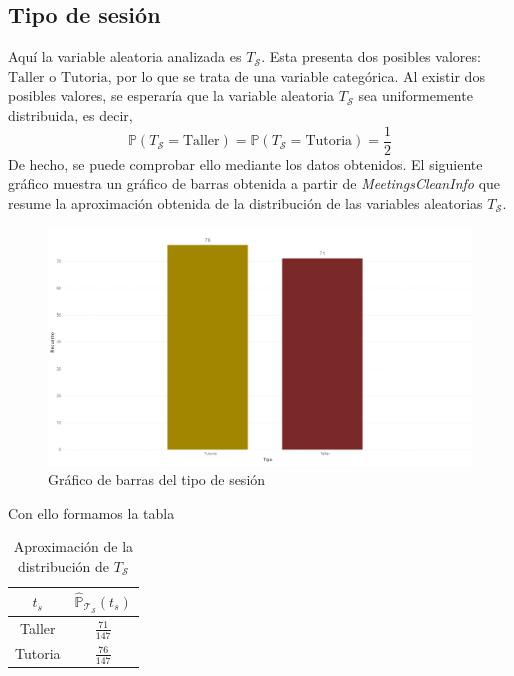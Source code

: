 \documentclass[11pt,a4paper]{book}
\theoremstyle{definition}%
\newcommand{\Probsymb}{\mathds{P}}
\newcommand{\Prob}[1]{\mathds{P}\left( #1 \right)}
\begin{document}
             \subsection{Tipo de sesión}
                Aquí la variable aleatoria analizada es $T_\mathcal{S}$. Esta presenta dos posibles valores: $\text{Taller}$ o $\text{Tutoria}$, por lo que se trata de una variable categórica. Al existir dos posibles valores, se esperaría que la variable aleatoria $T_\mathcal{S}$ sea uniformemente distribuida, es decir,
                \begin{equation}\label{uniforme tipo de sesion}
                    \Prob{T_\mathcal{S}=\text{Taller}}=\Prob{T_\mathcal{S}=\text{Tutoria}}=\frac{1}{2}
                \end{equation}
                De hecho, se puede comprobar ello mediante los datos obtenidos. El siguiente gráfico muestra un gráfico de barras obtenida a partir de \textit{MeetingsCleanInfo} que resume la aproximación obtenida de la distribución de las variables aleatorias $T_\mathcal{S}$.
                \begin{figure}[H]
                    \centering
                    \includegraphics[width=1\textwidth]{Sources/histograma_TipoGlobal.png}
                    \caption{Gráfico de barras del tipo de sesión}
                    \label{fig:histograma_TipoGlobal}
                \end{figure}
                Con ello formamos la tabla
                \begin{table}[H]
                    \centering
                    \begin{tabular}{|c|c|}
                        \hline
                        $t_s$ & $\hat{\Probsymb}_{\mathcal{T}_\mathcal{S}}(t_s)$ \\ \hline
                        Taller & $\frac{71}{147}$ \\ \hline
                        Tutoria & $\frac{76}{147}$ \\ \hline
                    \end{tabular}
                    \caption{Aproximación de la distribución de $T_\mathcal{S}$}
                \end{table}
\end{document}
